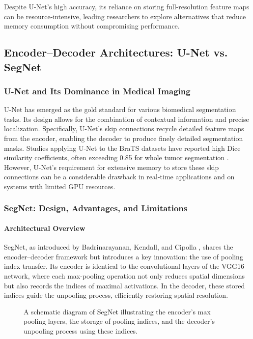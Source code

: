 Despite U-Net's high accuracy, its reliance on storing full-resolution feature maps can be resource-intensive, leading researchers to explore alternatives that reduce memory consumption without compromising performance.

\subsection{Encoder–Decoder Architectures: U-Net vs. SegNet}
\label{sec:unet_vs_segnet}

\subsubsection{U-Net and Its Dominance in Medical Imaging}
\label{sec:unet_dominance}
U-Net has emerged as the gold standard for various biomedical segmentation tasks. Its design allows for the combination of contextual information and precise localization. Specifically, U-Net's skip connections recycle detailed feature maps from the encoder, enabling the decoder to produce finely detailed segmentation masks. Studies applying U-Net to the BraTS datasets have reported high Dice similarity coefficients, often exceeding 0.85 for whole tumor segmentation \cite{ronneberger2015unet}. However, U-Net's requirement for extensive memory to store these skip connections can be a considerable drawback in real-time applications and on systems with limited GPU resources.

\subsubsection{SegNet: Design, Advantages, and Limitations}
\label{sec:segnet_design}

\paragraph{Architectural Overview}
\label{sec:segnet_overview}
SegNet, as introduced by Badrinarayanan, Kendall, and Cipolla \cite{badrinarayanan2017segnet}, shares the encoder–decoder framework but introduces a key innovation: the use of pooling index transfer. Its encoder is identical to the convolutional layers of the VGG16 network, where each max-pooling operation not only reduces spatial dimensions but also records the indices of maximal activations. In the decoder, these stored indices guide the unpooling process, efficiently restoring spatial resolution.

\begin{figure}[ht]
    \centering
    \caption{A schematic diagram of SegNet illustrating the encoder's max pooling layers, the storage of pooling indices, and the decoder's unpooling process using these indices.}
    \label{fig:segnet_architecture}
\end{figure}

